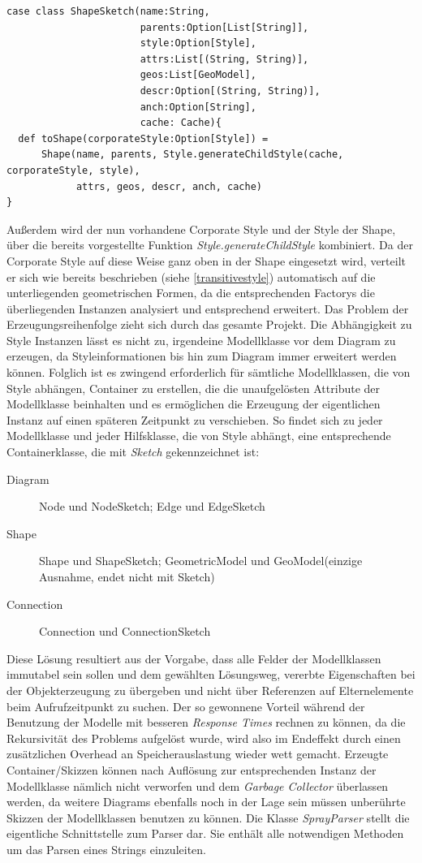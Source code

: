 \begin{lstlisting}[style=scala, caption = {Definition der ShapeSketch container Klasse}, label = {lst:shapesketch}]
case class ShapeSketch(name:String,
                       parents:Option[List[String]],
                       style:Option[Style],
                       attrs:List[(String, String)],
                       geos:List[GeoModel],
                       descr:Option[(String, String)],
                       anch:Option[String],
                       cache: Cache){
  def toShape(corporateStyle:Option[Style]) = 
      Shape(name, parents, Style.generateChildStyle(cache, corporateStyle, style),
            attrs, geos, descr, anch, cache)
}
\end{lstlisting}Außerdem wird der nun vorhandene Corporate Style und der Style der Shape, über die bereits vorgestellte Funktion \textit{Style.generateChildStyle} kombiniert. Da der Corporate Style auf diese Weise ganz oben in der Shape eingesetzt wird, verteilt er sich wie bereits beschrieben (siehe \ref{transitivestyle}) automatisch auf die unterliegenden geometrischen Formen, da die entsprechenden Factorys die überliegenden Instanzen analysiert und entsprechend erweitert. Das Problem der Erzeugungsreihenfolge zieht sich durch das gesamte Projekt. Die Abhängigkeit zu Style Instanzen lässt es nicht zu, irgendeine Modellklasse vor dem Diagram zu erzeugen, da Styleinformationen bis hin zum Diagram immer erweitert werden können.
Folglich ist es zwingend erforderlich für sämtliche Modellklassen, die von Style abhängen, Container zu erstellen, die die unaufgelösten Attribute der Modellklasse beinhalten und es ermöglichen die Erzeugung der eigentlichen Instanz auf einen späteren Zeitpunkt zu verschieben. So findet sich zu jeder Modellklasse und jeder Hilfsklasse, die von Style abhängt, eine entsprechende Containerklasse, die mit \textit{Sketch} gekennzeichnet ist:
\begin{description}
\item[Diagram] Node und NodeSketch; Edge und EdgeSketch
\item[Shape] Shape und ShapeSketch; GeometricModel und GeoModel(einzige Ausnahme, endet nicht mit Sketch)
\item[Connection] Connection und ConnectionSketch
\end{description}Diese Lösung resultiert aus der Vorgabe, dass alle Felder der Modellklassen immutabel sein sollen und dem gewählten Lösungsweg, vererbte Eigenschaften bei der Objekterzeugung zu übergeben und nicht über Referenzen auf Elternelemente beim Aufrufzeitpunkt zu suchen. Der so gewonnene Vorteil während der Benutzung der Modelle mit besseren \textit{Response Times} rechnen zu können, da die Rekursivität des Problems aufgelöst wurde, wird also im Endeffekt durch einen zusätzlichen Overhead an Speicherauslastung wieder wett gemacht. Erzeugte Container/Skizzen können nach Auflösung zur entsprechenden Instanz der Modellklasse nämlich nicht verworfen und dem \textit{Garbage Collector} überlassen werden, da weitere Diagrams ebenfalls noch in der Lage sein müssen unberührte Skizzen der Modellklassen benutzen zu können. Die Klasse \textit{SprayParser} stellt die eigentliche Schnittstelle zum Parser dar. Sie enthält alle notwendigen Methoden um das Parsen eines Strings einzuleiten. 
